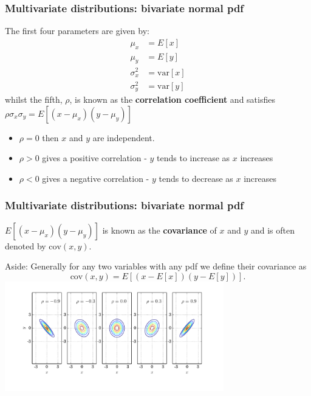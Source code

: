 \begin{frame}

\frametitle{Multivariate distributions: bivariate normal pdf}
\label{multivariatedistributions:bivariatenormalpdf}

The first four parameters are given by:
\begin{align*}
    \mu_x &= E[x] \\
    \mu_y &= E[y] \\
    \sigma_x^2 &= \text{var}[x] \\
    \sigma_y^2 &= \text{var}[y]
\end{align*}
whilst the fifth, $\rho$, is known as the \textbf{correlation coefficient} and satisfies
$\rho \sigma_x \sigma_y = E[(x-\mu_x)(y-\mu_y)]$

\begin{itemize}
\item $\rho = 0$ then $x$ and $y$ are independent.

\item $\rho > 0$ gives a positive correlation - $y$ tends to increase as $x$ increases

\item $\rho < 0$ gives a negative correlation - $y$ tends to decrease as $x$ increases

\end{itemize}

\end{frame}

\begin{frame}

\frametitle{Multivariate distributions: bivariate normal pdf}
\label{multivariatedistributions:bivariatenormalpdf}

$E[(x-\mu_x)(y-\mu_y)]$ is known as the \textbf{covariance} of $x$ and $y$ and is often denoted
by $\text{cov}(x,y)$.

Aside: Generally for any two variables with any pdf we define their covariance as
\[
\text{cov}(x,y) = E[(x-E[x])(y-E[y])].
\]
\includegraphics[keepaspectratio,width=\textwidth,height=135pt]{figures/bivariate_normal.pdf}

\end{frame}

